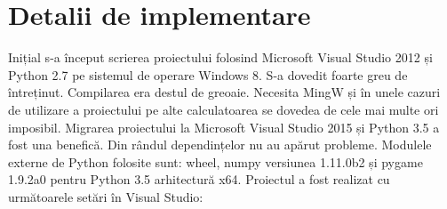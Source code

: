 \chapter{Detalii de implementare}
\label{cap:implementare}


%
%
%
%
%  
%    
%    


Inițial s-a început scrierea proiectului folosind Microsoft Visual Studio 2012 și Python 2.7 pe sistemul de operare Windows 8. S-a dovedit foarte greu de întreținut. Compilarea era destul de greoaie. Necesita MingW și în unele cazuri de utilizare a proiectului pe alte calculatoarea se dovedea de cele mai multe ori imposibil. Migrarea proiectului la Microsoft Visual Studio 2015 și Python 3.5 a fost una benefică. Din rândul dependințelor nu au apărut probleme. Modulele externe de Python folosite sunt: wheel, numpy versiunea 1.11.0b2 și pygame 1.9.2a0 pentru Python 3.5 arhitectură x64. Proiectul a fost realizat cu următoarele setări în Visual Studio:  

